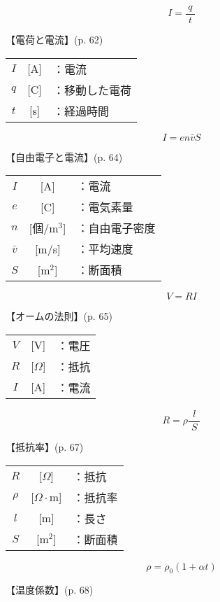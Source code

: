 \documentclass[10pt]{jarticle}
\begin{document}
\newpage
\[
I = \frac{q}{\; t \;}
\]


\vskip3mm
【電荷と電流】{\footnotesize (p. 62)}


\begin{tabular}{ccl}
$I$	&[A]	&：電流 \\
$q$	&[C]	&：移動した電荷\\
$t$	&[s]	&：経過時間
\end{tabular}




\newpage
\[
I = en \bar{v} S
\]


\vskip3mm
【自由電子と電流】{\footnotesize (p. 64)}


\begin{tabular}{ccl}
$I$	&[A]	&：電流 \\
$e$	&[C]	&：電気素量\\
$n$	&[個/m$^3$]	&：自由電子密度\\
$\bar{v}$	&[m/s]	&：平均速度\\
$S$	&[m$^2$]	&：断面積
\end{tabular}






\newpage
\[
V = R I
\]


\vskip3mm
【オームの法則】{\footnotesize (p. 65)}

\begin{tabular}{ccl}
$V$	& [V]	&：電圧\\
$R$	&[$\Omega$]	&：抵抗\\
$I$	&[A]	&：電流
\end{tabular}



\newpage
\[
R = \rho \frac{l}{\; S \;}
\]


\vskip3mm
【抵抗率】{\footnotesize (p. 67)}

\begin{tabular}{ccl}
$R$	&[$\Omega$]	&：抵抗\\
$\rho$	&[$\Omega \cdot $m]	&：抵抗率\\
$l$	&[m]	&：長さ\\
$S$	&[m$^2$]	&：断面積
\end{tabular}





\newpage
\[
\rho = \rho_0 (1 + \alpha t)
\]


\vskip3mm
【温度係数】{\footnotesize (p. 68)}
\end{document}
